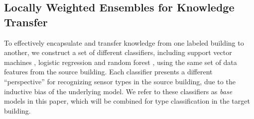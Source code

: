 \subsection{Locally Weighted Ensembles for Knowledge Transfer}
To effectively encapsulate and transfer knowledge from one labeled building to another,
we construct a set of different classifiers, including support vector machines \cite{suykens1999least}, logistic regression \cite{hosmer2004applied} and random forest \cite{liaw2002classification},
using the same set of data features from the source building.
Each classifier presents a different ``perspective'' for recognizing sensor types in the source building, due to the inductive bias of the underlying model.  We refer to these classifiers as {\it base} models in this paper, which will be combined for type classification in the target building.


